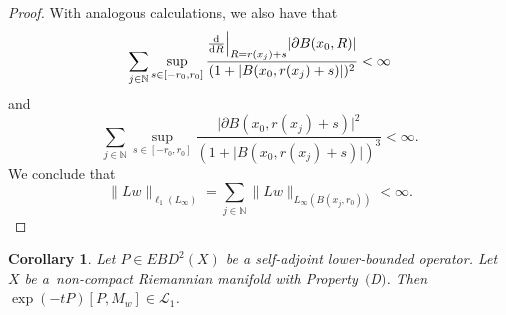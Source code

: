 \documentclass[pdftex]{sigma}
\numberwithin{equation}{section}
\newtheorem{Corollary}[Theorem]{Corollary}
\newcommand{\abs}[1]{\lvert#1\rvert}
\begin{document}
\begin{proof}
With analogous calculations, we also have that
\[
\sum_{j\in \mathbb{N}}\sup_{s \in [-r_0, r_0]} \frac{\frac{{\rm d}}{{\rm d}R}\Big|_{R= r(x_j)+s}\abs{\partial B(x_0, R)}}{(1+\abs{B(x_0,r(x_j)+s)})^2} <\infty
\]
and
\[
\sum_{j \in \mathbb{N}}\sup_{s \in [-r_0, r_0]} \frac{\abs{\partial B(x_0, r(x_j)+s)}^2}{(1+\abs{B(x_0,r(x_j)+s)})^3} < \infty.
\]
We conclude that
\[
\|Lw\|_{\ell_1(L_\infty)} = \sum_{j\in \mathbb{N}} \| Lw \|_{L_{\infty}(B(x_j,r_0))} < \infty.
\tag*{\qed}
\]
\renewcommand{\qed}{}
\end{proof}

\begin{Corollary}\label{C:CwikelL1}
Let $P\in EBD^2(X)$ be a self-adjoint lower-bounded operator. Let $X$ be a~non-compact Riemannian manifold with Property~$($D$)$. Then $\exp(-tP)[P, M_w] \in \mathcal{L}_1$.
\end{Corollary}
\end{document}
